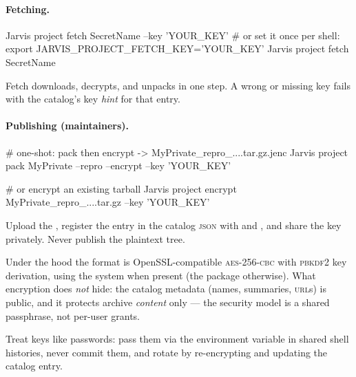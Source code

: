 \paragraph{Fetching.}

\begin{terminal}
\begin{jcmd}
Jarvis project fetch SecretName --key 'YOUR_KEY'
# or set it once per shell:
export JARVIS_PROJECT_FETCH_KEY='YOUR_KEY'
Jarvis project fetch SecretName
\end{jcmd}
\end{terminal}

Fetch downloads, decrypts, and unpacks in one step. A wrong or missing key fails with
the catalog's key \emph{hint} for that entry.

\paragraph{Publishing (maintainers).}

\begin{terminal}
\begin{jcmd}
# one-shot: pack then encrypt -> MyPrivate_repro_....tar.gz.jenc
Jarvis project pack MyPrivate --repro --encrypt --key 'YOUR_KEY'

# or encrypt an existing tarball
Jarvis project encrypt MyPrivate_repro_....tar.gz --key 'YOUR_KEY'
\end{jcmd}
\end{terminal}

Upload the , register the entry in the catalog \textsc{json} with
 and , and share the key privately.
Never publish the plaintext tree.

\begin{jnote}
Under the hood the format is OpenSSL-compatible \textsc{aes}-256-\textsc{cbc} with
\textsc{pbkdf2} key derivation, using the system  when present (the
 package otherwise). What encryption does \emph{not} hide: the
catalog metadata (names, summaries, \textsc{url}s) is public, and it protects archive
\emph{content} only --- the security model is a shared passphrase, not per-user grants.
\end{jnote}

\begin{jwarn}
Treat keys like passwords: pass them via the environment variable in shared shell
histories, never commit them, and rotate by re-encrypting and updating the catalog
entry.
\end{jwarn}

